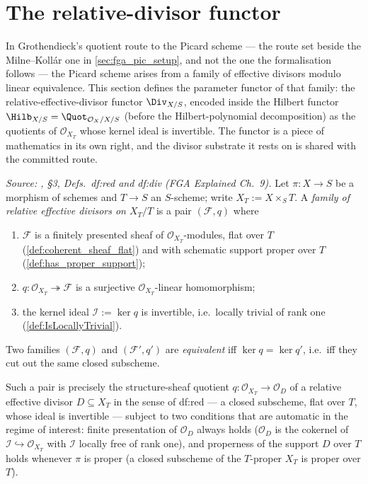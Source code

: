 \section{The relative-divisor functor}
\label{sec:div_functor}

In Grothendieck's quotient route to the Picard scheme --- the route set beside
the Milne--Koll\'ar one in \cref{sec:fga_pic_setup}, and not the one the
formalisation follows --- the Picard scheme arises from a family of effective
divisors modulo linear equivalence.  This section defines the parameter functor
of that family: the relative-effective-divisor functor \(\Div_{X/S}\), encoded
inside the Hilbert functor \(\Hilb_{X/S} = \Quot_{\mathcal O_X/X/S}\) (before the
Hilbert-polynomial decomposition) as the quotients of
\(\mathcal O_{X_T}\) whose kernel ideal is invertible.  The functor is a piece of
mathematics in its own right, and the divisor substrate it rests on is shared
with the committed route.

\begin{definition}\leanok
  \label{def:div_family}
  \textit{Source: \cite{kleiman-picard}, \S 3, Defs.~df:red and df:div (FGA Explained
  Ch.~9).}
  Let \(\pi : X \to S\) be a morphism of schemes and \(T \to S\) an
  \(S\)-scheme; write \(X_T := X \times_S T\).  A \emph{family of relative
  effective divisors on \(X_T/T\)} is a pair \((\mathcal F, q)\) where
  \begin{enumerate}
    \item \(\mathcal F\) is a finitely presented sheaf of
      \(\mathcal O_{X_T}\)-modules, flat over \(T\)
      (\cref{def:coherent_sheaf_flat}) and with schematic support proper
      over \(T\) (\cref{def:has_proper_support});
    \item \(q : \mathcal O_{X_T} \twoheadrightarrow \mathcal F\) is a
      surjective \(\mathcal O_{X_T}\)-linear homomorphism;
    \item the kernel ideal \(\mathcal I := \ker q\) is invertible, i.e.\
      locally trivial of rank one (\cref{def:IsLocallyTrivial}).
  \end{enumerate}
  Two families \((\mathcal F, q)\) and \((\mathcal F', q')\) are
  \emph{equivalent} iff \(\ker q = \ker q'\), i.e.\ iff they cut out the same
  closed subscheme.

  Such a pair is precisely the structure-sheaf quotient
  \(q : \mathcal O_{X_T} \to \mathcal O_D\) of a relative effective divisor
  \(D \subseteq X_T\) in the sense of \cite{kleiman-picard} df:red --- a closed
  subscheme, flat over \(T\), whose ideal is invertible --- subject to two
  conditions that are automatic in the regime of interest: finite
  presentation of \(\mathcal O_D\) always holds (\(\mathcal O_D\) is the
  cokernel of \(\mathcal I \hookrightarrow \mathcal O_{X_T}\) with
  \(\mathcal I\) locally free of rank one), and properness of the support
  \(D\) over \(T\) holds whenever \(\pi\) is proper (a closed subscheme of
  the \(T\)-proper \(X_T\) is proper over \(T\)).
\end{definition}

